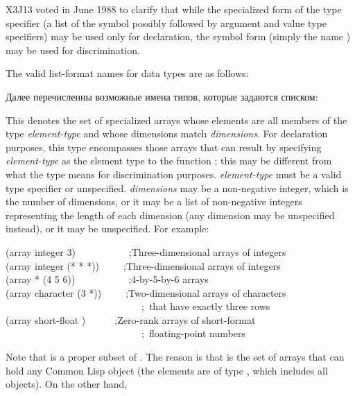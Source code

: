 \begin{new}
X3J13 voted in June 1988  to clarify that
while the specialized form of the  type specifier
(a list of the symbol  possibly followed by
argument and value type specifiers)
may be used only for declaration, the symbol form (simply the name
) may be used for discrimination.
\end{new}

The valid list-format names for data types are as follows:

Далее перечисленны возможные имена типов, которые задаются списком:

\begin{flushdesc}
\item[\cd{(array {\it element-type} {\it dimensions})}]
This denotes the set
of specialized arrays
whose elements are all members of the type {\it element-type}
and whose dimensions match {\it dimensions}.
For declaration purposes, this type encompasses those arrays
that can result by specifying {\it element-type} as the element type
to the function ; this may be different
from what the type means for discrimination purposes.
{\it element-type} must be a valid type specifier or unspecified.
{\it dimensions} may be a non-negative integer, which is the number
of dimensions, or it may be a list of non-negative integers
representing the length of each dimension (any dimension
may be unspecified instead), or it may be unspecified.
For example:
\begin{lisp}
(array integer 3)~~~~~~~~~~~;{\rm Three-dimensional arrays of integers} \\
(array integer (* * *))~~~~~;{\rm Three-dimensional arrays of integers} \\
(array * (4 5 6))~~~~~~~~~~~;{\rm 4-by-5-by-6 arrays} \\
(array character (3 *))~~~~~;{\rm Two-dimensional arrays of characters} \\
~~~~~~~~~~~~~~~~~~~~~~~~~~~~;~{\rm that have exactly three rows} \\
(array short-float {\emptylist})~~~~~~;{\rm Zero-rank arrays of short-format} \\
~~~~~~~~~~~~~~~~~~~~~~~~~~~~;~{\rm floating-point numbers}
\end{lisp}
Note that  is a proper subset of .
The reason is that  is the set of arrays that can
hold any Common Lisp object (the elements are of type ,
which includes all objects).  On the other hand, 

\end{flushdesc}
